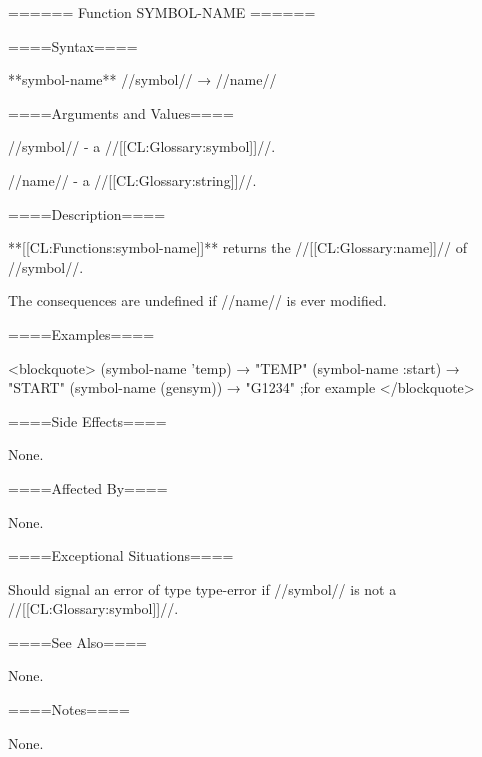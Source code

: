 ====== Function SYMBOL-NAME ======

====Syntax====

**symbol-name** //symbol// → //name//

====Arguments and Values====

//symbol// - a //[[CL:Glossary:symbol]]//.

//name// - a //[[CL:Glossary:string]]//.

====Description====

**[[CL:Functions:symbol-name]]** returns the //[[CL:Glossary:name]]// of //symbol//.

The consequences are undefined if //name// is ever modified.

====Examples====

<blockquote> (symbol-name 'temp) → "TEMP" (symbol-name :start) → "START" (symbol-name (gensym)) → "G1234" ;for example </blockquote>

====Side Effects====

None.

====Affected By====

None.

====Exceptional Situations====

Should signal an error of type type-error if //symbol// is not a //[[CL:Glossary:symbol]]//.

====See Also====

None.

====Notes====

None.

